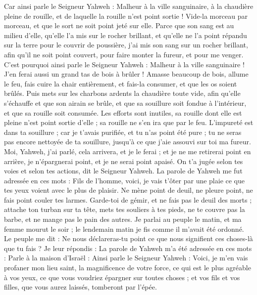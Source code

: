 \begin{multicols}{2}
Car ainsi parle le Seigneur Yahweh : Malheur à la ville sanguinaire, à la chaudière pleine de rouille, et de laquelle la rouille n'est point sortie ! Vide-la morceau par morceau, et que le sort ne soit point jeté sur elle.
Parce que son sang est au milieu d'elle, qu'elle l'a mis sur le rocher brillant, et qu'elle ne l'a point répandu sur la terre pour le couvrir de poussière,
j'ai mis son sang sur un rocher brillant, afin qu'il ne soit point couvert, pour faire monter la fureur, et pour me venger.
C'est pourquoi ainsi parle le Seigneur Yahweh : Malheur à la ville sanguinaire ! J'en ferai aussi un grand tas de bois à brûler !
Amasse beaucoup de bois, allume le feu, fais cuire la chair entièrement, et fais-la consumer, et que les os soient brûlés.
Puis mets sur les charbons ardents la chaudière toute vide, afin qu'elle s'échauffe et que son airain se brûle, et que sa souillure soit fondue à l’intérieur, et que sa rouille soit consumée.
Les efforts sont inutiles, sa rouille dont elle est pleine n'est point sortie d'elle ; sa rouille ne s'en ira que par le feu.
L’impureté est dans ta souillure ; car je t'avais purifiée, et tu n'as point été pure ; tu ne seras pas encore nettoyée de ta souillure, jusqu'à ce que j’aie assouvi sur toi ma fureur.
Moi, Yahweh, j'ai parlé, cela arrivera, et je le ferai ; et je ne me retirerai point en arrière, je n'épargnerai point, et je ne serai point apaisé. On t'a jugée selon tes voies et selon tes actions, dit le Seigneur Yahweh.
La parole de Yahweh me fut adressée en ces mots :
Fils de l’homme, voici, je vais t'ôter par une plaie ce que tes yeux voient avec le plus de plaisir. Ne mène point de deuil, ne pleure point, ne fais point couler tes larmes.
Garde-toi de gémir, et ne fais pas le deuil des morts ; attache ton turban sur ta tête, mets tes souliers à tes pieds, ne te couvre pas la barbe, et ne mange pas le pain des autres.
Je parlai au peuple le matin, et ma femme mourut le soir ; le lendemain matin je fis comme il m'avait été ordonné.
Le peuple me dit : Ne nous déclareras-tu point ce que nous signifient ces choses-là que tu fais ?
Je leur répondis : La parole de Yahweh m'a été adressée en ces mots :
Parle à la maison d'Israël : Ainsi parle le Seigneur Yahweh : Voici, je m'en vais profaner mon lieu saint, la magnificence de votre force, ce qui est le plus agréable à vos yeux, ce que vous voudriez épargner sur toutes choses ; et vos fils et vos filles, que vous aurez laissés, tomberont par l'épée.

\end{multicols}

